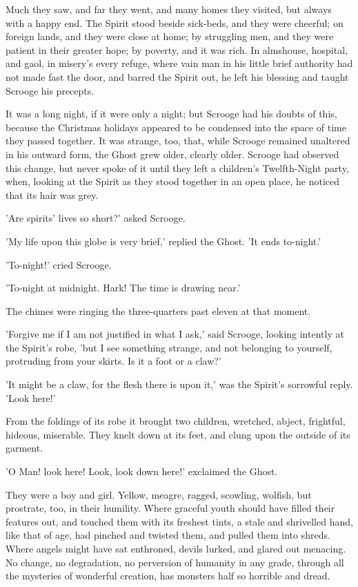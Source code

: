 Much they saw, and far they went, and many homes they visited, but
always with a happy end. The Spirit stood beside sick-beds, and they
were cheerful; on foreign lands, and they were close at home; by
struggling men, and they were patient in their greater hope; by poverty,
and it was rich. In almshouse, hospital, and gaol, in misery's every
refuge, where vain man in his little brief authority had not made fast
the door, and barred the Spirit out, he left his blessing and taught
Scrooge his precepts.

It was a long night, if it were only a night; but Scrooge had his doubts
of this, because the Christmas holidays appeared to be condensed into
the space of time they passed together. It was strange, too, that, while
Scrooge remained unaltered in his outward form, the Ghost grew older,
clearly older. Scrooge had observed this change, but never spoke of it
until they left a children's Twelfth-Night party, when, looking at the
Spirit as they stood together in an open place, he noticed that its hair
was grey.

'Are spirits' lives so short?' asked Scrooge.

'My life upon this globe is very brief,' replied the Ghost. 'It ends
to-night.'

'To-night!' cried Scrooge.

'To-night at midnight. Hark! The time is drawing near.'

The chimes were ringing the three-quarters past eleven at that moment.

'Forgive me if I am not justified in what I ask,' said Scrooge, looking
intently at the Spirit's robe, 'but I see something strange, and not
belonging to yourself, protruding from your skirts. Is it a foot or a
claw?'

'It might be a claw, for the flesh there is upon it,' was the Spirit's
sorrowful reply. 'Look here!'

From the foldings of its robe it brought two children, wretched, abject,
frightful, hideous, miserable. They knelt down at its feet, and clung
upon the outside of its garment.

'O Man! look here! Look, look down here!' exclaimed the Ghost.

They were a boy and girl. Yellow, meagre, ragged, scowling, wolfish, but
prostrate, too, in their humility. Where graceful youth should have
filled their features out, and touched them with its freshest tints, a
stale and shrivelled hand, like that of age, had pinched and twisted
them, and pulled them into shreds. Where angels might have sat
enthroned, devils lurked, and glared out menacing. No change, no
degradation, no perversion of humanity in any grade, through all the
mysteries of wonderful creation, has monsters half so horrible and
dread.

